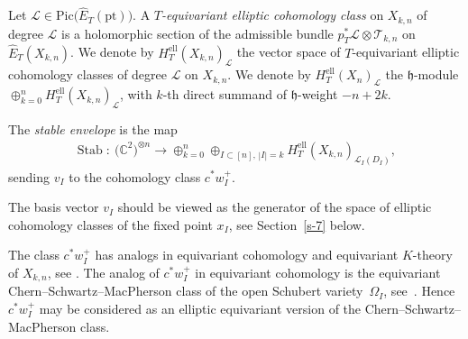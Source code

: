 \documentclass[pdftex]{sigma}
\numberwithin{equation}{section}
\begin{document}
\begin{Definition} Let $\mathcal L\in\mathrm{Pic}\big(\hat E_T(\mathrm{pt})\big)$. A {\em $T$-equivariant elliptic cohomology class} on $X_{k,n}$ of degree $\mathcal L$ is a holomorphic section of the admissible bundle $p_T^*\mathcal L\otimes \mathcal T_{k,n}$ on $\hat E_T(X_{k,n})$. We denote by $ H_T^{\mathrm{ell}}(X_{k,n})_{\mathcal L}$ the vector space of $T$-equivariant elliptic cohomology classes of degree $\mathcal L$ on $X_{k,n}$. We denote by $H_T^{\mathrm{ell}}(X_n)_{\mathcal L}$ the $\mathfrak h$-module $\oplus_{k=0}^n H_T^{\mathrm{ell}}(X_{k,n})_{\mathcal L}$, with $k$-th direct summand of $\mathfrak h$-weight $-n+2k$.
\end{Definition}
\begin{Definition} The {\em stable envelope} is the map
\begin{gather}\label{e-stable1}
 \operatorname{Stab}\colon \ \big(\mathbb{C}^2\big)^{\otimes n}\to \oplus_{k=0}^{n}\oplus_{I\subset [n],\,|I|=k} H_T^{\mathrm{ell}}(X_{k,n})_{\mathcal L_I(D_I)},
\end{gather}
sending $v_I$ to the cohomology class $c ^*w_I^+$.
\end{Definition}
\begin{Remark} The basis vector $v_I$ should be viewed as the generator of the space of elliptic cohomology classes of the fixed point $x_I$, see Section~\ref{s-7} below.
\end{Remark}
\begin{Remark} The class $c ^*w_I^+$ has analogs in equivariant cohomology and equivariant $K$-theory of $X_{k,n}$, see \cite{GRTV,RTV,RTV2}. The analog of $c ^*w_I^+$ in equivariant cohomology is the equivariant Chern--Schwartz--MacPherson class of the open Schubert variety~$\Omega_I$, see~\cite{RV1}. Hence $c ^*w_I^+$ may be considered as an elliptic equivariant version of the Chern--Schwartz--MacPherson class.
\end{Remark}
\end{document}
